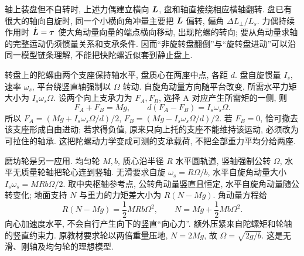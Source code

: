轴上装盘但不自转时, 上述力偶建立横向 $\boldsymbol{L}$, 盘和轴直接绕相应横轴翻转. 盘已有很大的轴向自旋时, 同一个小横向角冲量主要把 $\boldsymbol{L}$ 偏转, 偏角 $\Delta L_\perp/L_s$. 力偶持续作用时 $\dot{\boldsymbol{L}}=\boldsymbol{\tau}$ 使大角动量向量的端点横向移动, 出现陀螺的转向; 要从角动量求轴的完整运动仍须惯量关系和支承条件. 因而“非旋转盘翻倒”与“旋转盘进动”可以沿同一模型链条理解, 不能把快陀螺近似套到静止盘上.

转盘上的陀螺由两个支座保持轴水平, 盘质心在两座中点, 各距 $d$. 盘自旋惯量 $I_s$, 速率 $\omega_s$, 平台绕竖直轴强制以 $\Omega$ 转动. 自旋角动量方向随平台改变, 所需水平力矩大小为 $I_s\omega_s\Omega$. 设两个向上支承力为 $F_A,F_B$, 选择 A 对应产生所需矩的一侧, 则
\[F_A+F_B=Mg,\qquad d(F_A-F_B)=I_s\omega_s\Omega.\]
所以 $F_A=(Mg+I_s\omega_s\Omega/d)/2$, $F_B=(Mg-I_s\omega_s\Omega/d)/2$. 若 $F_B=0$, 恰可撤去该支座形成自由进动; 若求得负值, 原来只向上托的支座不能维持该运动, 必须改为可拉住的轴承. 这把陀螺动力学变成可测的支承载荷, 不把全部重力平均分给两座.

磨坊轮是另一应用. 均匀轮 $M,b$, 质心沿半径 $R$ 水平圆轨道, 竖轴强制公转 $\Omega$, 水平无质量轮轴把轮心连到竖轴. 无滑要求自旋 $\omega_s=R\Omega/b$, 水平自旋角动量大小 $I_s\omega_s=MRb\Omega/2$. 取中央枢轴参考点, 公转角动量竖直且恒定, 水平自旋角动量随公转变化; 地面支持 $N$ 与重力的力矩差大小为 $R(N-Mg)$. 角动量方程给
\[R(N-Mg)=\frac12MRb\Omega^2,\qquad N=Mg+\frac12Mb\Omega^2.\]
向心加速度水平, 不会自行产生向下的竖直“向心力”. 额外压紧来自陀螺矩和轮轴的竖直约束力. 原教材要求轮以两倍重量压地, $N=2Mg$, 故 $\Omega=\sqrt{2g/b}$. 这是无滑、刚轴及均匀轮的理想模型.
